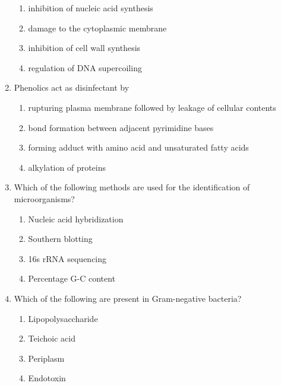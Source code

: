 \documentclass[journal,12pt,onecolumn]{IEEEtran}
\theoremstyle{remark}
\begin{document}
\begin{enumerate}
    \begin{enumerate}
        \item inhibition of nucleic acid synthesis
        \item damage to the cytoplasmic membrane
        \item inhibition of cell wall synthesis
        \item regulation of DNA supercoiling
    \end{enumerate}

    \item Phenolics act as disinfectant by

    \hfill{}

    \begin{enumerate}
        \item rupturing plasma membrane followed by leakage of cellular contents
        \item bond formation between adjacent pyrimidine bases
        \item forming adduct with amino acid and unsaturated fatty acids
        \item alkylation of proteins
    \end{enumerate}

    \item Which of the following methods are used for the identification of microorganisms?

    \hfill{}

    \begin{enumerate}
        \item Nucleic acid hybridization
        \item Southern blotting
        \item 16s rRNA sequencing
        \item Percentage G-C content
    \end{enumerate}

    \item Which of the following are present in Gram-negative bacteria?

    \hfill{}

    \begin{enumerate}
        \item Lipopolysaccharide
        \item Teichoic acid
        \item Periplasm
        \item Endotoxin
    \end{enumerate}


\end{enumerate}
\end{document}
